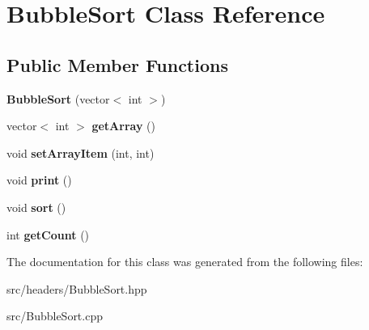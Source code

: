\hypertarget{classBubbleSort}{\section{Bubble\-Sort Class Reference}
\label{classBubbleSort}
}
\subsection*{Public Member Functions}
\begin{DoxyCompactItemize}
\item 
\hypertarget{classBubbleSort_a37dbbb33b96e4f4f62548efc5ec0dc14}{{\bfseries Bubble\-Sort} (vector$<$ int $>$)}\label{classBubbleSort_a37dbbb33b96e4f4f62548efc5ec0dc14}

\item 
\hypertarget{classBubbleSort_a335ea6d7f63605717bf64bba237aa70d}{vector$<$ int $>$ {\bfseries get\-Array} ()}\label{classBubbleSort_a335ea6d7f63605717bf64bba237aa70d}

\item 
\hypertarget{classBubbleSort_a758d4700e0c0bb5c1d838ce4f7d7bb77}{void {\bfseries set\-Array\-Item} (int, int)}\label{classBubbleSort_a758d4700e0c0bb5c1d838ce4f7d7bb77}

\item 
\hypertarget{classBubbleSort_a6bad543a0fc648d1f259897e278f8edd}{void {\bfseries print} ()}\label{classBubbleSort_a6bad543a0fc648d1f259897e278f8edd}

\item 
\hypertarget{classBubbleSort_a6473a440293352ef80c837f0d8e2a045}{void {\bfseries sort} ()}\label{classBubbleSort_a6473a440293352ef80c837f0d8e2a045}

\item 
\hypertarget{classBubbleSort_a2f4e1f57a7d6132ee30b4503f1d44ae2}{int {\bfseries get\-Count} ()}\label{classBubbleSort_a2f4e1f57a7d6132ee30b4503f1d44ae2}

\end{DoxyCompactItemize}


The documentation for this class was generated from the following files\-:\begin{DoxyCompactItemize}
\item 
src/headers/Bubble\-Sort.\-hpp\item 
src/Bubble\-Sort.\-cpp\end{DoxyCompactItemize}
